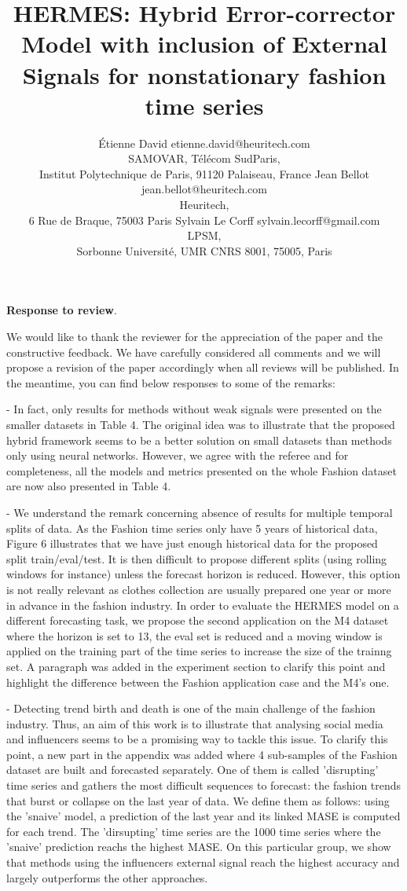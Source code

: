 \documentclass[10pt]{article} %
\title{HERMES: Hybrid Error-corrector Model with inclusion of External Signals for nonstationary fashion time series}
\author{\name \'Etienne David \email etienne.david@heuritech.com \\
      \addr SAMOVAR, Télécom SudParis,\\
      Institut Polytechnique de Paris, 91120 Palaiseau, France
      \AND
      \name Jean Bellot \email jean.bellot@heuritech.com \\
      \addr Heuritech, \\
      6 Rue de Braque, 75003 Paris
      \AND
      \name Sylvain Le Corff \email sylvain.lecorff@gmail.com\\
      \addr LPSM, \\
      Sorbonne Université, UMR CNRS 8001, 75005, Paris
      }
\begin{document}
\textbf{Response to review}.\vspace{0.2cm}

We would like to thank the reviewer for the appreciation of the paper and the constructive feedback. We have carefully considered all comments and we will propose a revision of the paper accordingly when all reviews will be published. In the meantime, you can find below responses to some of the remarks:

- In fact, only results for methods without weak signals were presented on the smaller datasets in Table 4. The original idea was to illustrate that the proposed hybrid framework seems to be a better solution on small datasets than methods only using neural networks. However, we agree with the referee and for completeness, all the models and metrics presented on the whole Fashion dataset are now also presented in Table 4.
	
- We understand the remark concerning absence of results for multiple temporal splits of data. As the Fashion time series only have 5 years of historical data, Figure 6 illustrates that we have just enough historical data for the proposed split train/eval/test. It is then difficult to propose different splits (using rolling windows for instance) unless the forecast horizon is reduced. However, this option is not really relevant as clothes collection are usually prepared one year or more in advance in the fashion industry.  In order to evaluate the HERMES model on a different forecasting task, we propose the second application on the M4 dataset where the horizon is set to 13, the eval set is reduced and a moving window is applied on the training part of the time series to increase the size of the trainng set. A paragraph was added in the experiment section to clarify this point and highlight the difference between the Fashion application case and the M4's one.

- Detecting trend birth and death is one of the main challenge of the fashion industry. Thus, an aim of this work is to illustrate that analysing social media and influencers seems to be a promising way to tackle this issue. To clarify this point, a new part in the appendix was added where 4 sub-samples of the Fashion dataset are built and forecasted separately. One of them is called 'disrupting' time series and gathers the most difficult sequences to forecast: the fashion trends that burst or collapse on the last year of data. We define them as follows: using the 'snaive' model, a prediction of the last year and its linked MASE is computed for each trend. The  'dirsupting' time series are the 1000 time series where the 'snaive' prediction reachs the highest MASE. On this particular group, we show that methods using the influencers external signal reach the highest accuracy and largely outperforms the other approaches.
\end{document}
